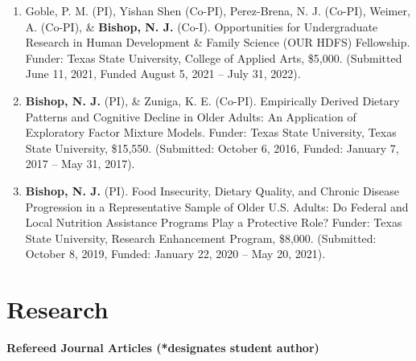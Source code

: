 \documentclass[
]{article}
\begin{document}
\begin{enumerate}
\def\labelenumi{\arabic{enumi}.}
\item
  Goble, P. M. (PI), Yishan Shen (Co-PI), Perez-Brena, N. J. (Co-PI),
  Weimer, A. (Co-PI), \& \textbf{Bishop, N. J.} (Co-I). Opportunities
  for Undergraduate Research in Human Development \& Family Science (OUR
  HDFS) Fellowship. Funder: Texas State University, College of Applied
  Arts, \$5,000. (Submitted June 11, 2021, Funded August 5, 2021 -- July
  31, 2022).
\item
  \textbf{Bishop, N. J.} (PI), \& Zuniga, K. E. (Co-PI). Empirically
  Derived Dietary Patterns and Cognitive Decline in Older Adults: An
  Application of Exploratory Factor Mixture Models. Funder: Texas State
  University, Texas State University, \$15,550. (Submitted: October 6,
  2016, Funded: January 7, 2017 -- May 31, 2017).
\item
  \textbf{Bishop, N. J.} (PI). Food Insecurity, Dietary Quality, and
  Chronic Disease Progression in a Representative Sample of Older U.S.
  Adults: Do Federal and Local Nutrition Assistance Programs Play a
  Protective Role? Funder: Texas State University, Research Enhancement
  Program, \$8,000. (Submitted: October 8, 2019, Funded: January 22,
  2020 -- May 20, 2021).
\end{enumerate}

\hypertarget{research}{%
\section{\texorpdfstring{\textbf{Research}}{Research}}\label{research}}

\textbf{Refereed Journal Articles (*designates student author)}
\end{document}
